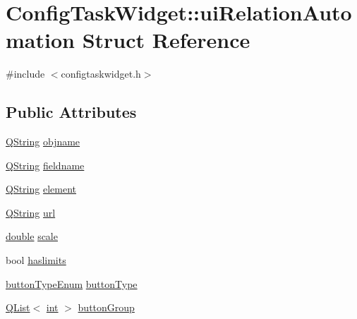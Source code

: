 \hypertarget{struct_config_task_widget_1_1ui_relation_automation}{\section{Config\-Task\-Widget\-:\-:ui\-Relation\-Automation Struct Reference}
\label{struct_config_task_widget_1_1ui_relation_automation}
}


{\ttfamily \#include $<$configtaskwidget.\-h$>$}

\subsection*{Public Attributes}
\begin{DoxyCompactItemize}
\item 
\hyperlink{group___u_a_v_objects_plugin_gab9d252f49c333c94a72f97ce3105a32d}{Q\-String} \hyperlink{group___u_a_v_object_widget_utils_ga3a6899c9cfb56d74f0bf98300a156bc7}{objname}
\item 
\hyperlink{group___u_a_v_objects_plugin_gab9d252f49c333c94a72f97ce3105a32d}{Q\-String} \hyperlink{group___u_a_v_object_widget_utils_ga727a26d7cef842f8e7cd274117a1153d}{fieldname}
\item 
\hyperlink{group___u_a_v_objects_plugin_gab9d252f49c333c94a72f97ce3105a32d}{Q\-String} \hyperlink{group___u_a_v_object_widget_utils_gabe7df1fc4c590dc11cc6f80698fc125c}{element}
\item 
\hyperlink{group___u_a_v_objects_plugin_gab9d252f49c333c94a72f97ce3105a32d}{Q\-String} \hyperlink{group___u_a_v_object_widget_utils_ga14b83b3a1113a21d03ee1b3e8967b7e7}{url}
\item 
\hyperlink{_super_l_u_support_8h_a8956b2b9f49bf918deed98379d159ca7}{double} \hyperlink{group___u_a_v_object_widget_utils_gafddb00770c074c3ce12d1699813a4d30}{scale}
\item 
bool \hyperlink{group___u_a_v_object_widget_utils_ga73f9beb614502506b14c6b5d235b9d44}{haslimits}
\item 
\hyperlink{group___u_a_v_object_widget_utils_gacf8aa6ed9da799d1973519df03d1ecfa}{button\-Type\-Enum} \hyperlink{group___u_a_v_object_widget_utils_gac8fcf738efe2855fbf1c7a810a20cffd}{button\-Type}
\item 
\hyperlink{class_q_list}{Q\-List}$<$ \hyperlink{ioapi_8h_a787fa3cf048117ba7123753c1e74fcd6}{int} $>$ \hyperlink{group___u_a_v_object_widget_utils_ga915cb6bdf9aff1b607f8917b6f665fbd}{button\-Group}
\end{DoxyCompactItemize}


